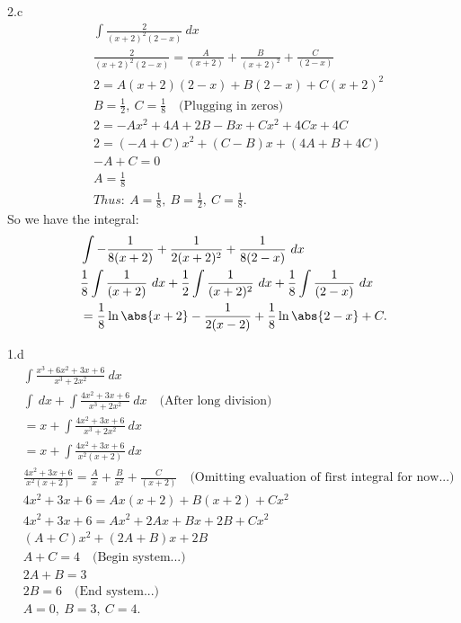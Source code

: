 \documentclass{report}
\begin{document}
    \pagebreak \bigbreak \noindent 
    2.c
    \bigbreak \noindent 
    \begin{align*}
        &\int \frac{2}{(x+2)^{2}(2-x)}\ dx \\
        &\frac{2}{(x+2)^{2}(2-x)} = \frac{A}{(x+2)} + \frac{B}{(x+2)^{2}} + \frac{C}{(2-x)} \\
        &2 = A(x+2)(2-x) + B(2-x) + C(x+2)^{2} \\
        &B = \frac{1}{2},\ C=\frac{1}{8}\quad \text{(Plugging in zeros)} \\
        &2=-Ax^{2}+4A+2B-Bx+Cx^{2}+4Cx +4C \\
        &2= (-A +C)x^{2} + (C-B)x + (4A + B + 4C) \\
        &-A+C=0 \\
        &A = \frac{1}{8} \\
        &Thus:\ A = \frac{1}{8},\ B=\frac{1}{2},\ C=\frac{1}{8}
    .\end{align*}
    \bigbreak \noindent 
    So we have the integral: 
    \begin{align*}
        &\int -\frac{1}{8(x+2)} + \frac{1}{2(x+2)^{2}} + \frac{1}{8(2-x)}\ dx \\
        &\frac{1}{8}\int \frac{1}{(x+2)}\ dx + \frac{1}{2}\int \frac{1}{(x+2)^{2}}\ dx + \frac{1}{8}\int \frac{1}{(2-x)}\ dx \\
        &=\frac{1}{8}\ln{\abs{x+2}}  -\frac{1}{2(x-2)} + \frac{1}{8}\ln{\abs{2-x}} + C
    .\end{align*}

    \bigbreak \noindent 
    1.d
    \bigbreak \noindent 
    \begin{align*}
        &\int \frac{x^{3} +6x^{2}+3x+6}{x^{3}+2x^{2}}\ dx \\
        &\int\ dx + \int \frac{4x^{2}+3x+6}{x^{3}+2x^{2}}\ dx \quad \text{(After long division)} \\
        &=x + \int \frac{4x^{2}+3x+6}{x^{3}+2x^{2}}\ dx  \\
        &=x + \int \frac{4x^{2}+3x+6}{x^{2}(x+2)}\ dx  \\ 
        &\frac{4x^{2}+3x+6}{x^{2}(x+2)} = \frac{A}{x} + \frac{B}{x^{2}} + \frac{C}{(x+2)} \quad \text{(Omitting evaluation of first integral for now...)}\\
        &4x^{2} +3x+6 = Ax(x+2) + B(x+2) + Cx^{2} \\
        &4x^{2} +3x +6 = Ax^{2}+2Ax +Bx+2B+Cx^{2} \\ 
        &(A+C)x^{2}  +(2A +B)x + 2B \\
        &A+C = 4 \quad \text{(Begin system...)} \\
        &2A+B = 3 \\
        &2B = 6 \quad \text{(End system...)} \\
        &A=0,\ B = 3,\ C=4
    .\end{align*}
\end{document}
